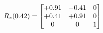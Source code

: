 \documentclass[preview]{standalone}
\begin{document}
\begin{align*}
\special{dvisvgm:raw <g id='unique000'>}R_{z}(0.42) = \begin{bmatrix}+0.91 & -0.41 & 0 \\+0.41 & +0.91 & 0 \\0 & 0 & 1\end{bmatrix}\special{dvisvgm:raw </g>}
\end{align*}
\end{document}
